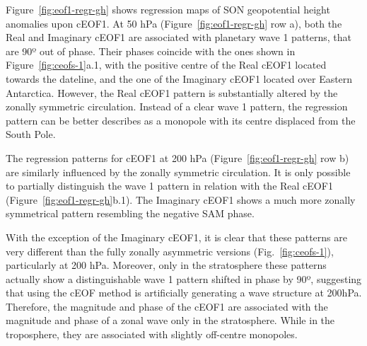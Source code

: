 \documentclass[smallextended]{svjour3}       %
\begin{document}
Figure~\ref{fig:eof1-regr-gh} shows regression maps of SON geopotential height anomalies upon cEOF1.
At 50 hPa (Figure~\ref{fig:eof1-regr-gh} row a), both the Real and Imaginary cEOF1 are associated with planetary wave 1 patterns, that are 90º out of phase.
Their phases coincide with the ones shown in Figure~\ref{fig:ceofs-1}a.1, with the positive centre of the Real cEOF1 located towards the dateline, and the one of the Imaginary cEOF1 located over Eastern Antarctica.
However, the Real cEOF1 pattern is substantially altered by the zonally symmetric circulation.
Instead of a clear wave 1 pattern, the regression pattern can be better describes as a monopole with its centre displaced from the South Pole.

The regression patterns for cEOF1 at 200 hPa (Figure~\ref{fig:eof1-regr-gh} row b) are similarly influenced by the zonally symmetric circulation.
It is only possible to partially distinguish the wave 1 pattern in relation with the Real cEOF1 (Figure~\ref{fig:eof1-regr-gh}b.1).
The Imaginary cEOF1 shows a much more zonally symmetrical pattern resembling the negative SAM phase.

With the exception of the Imaginary cEOF1, it is clear that these patterns are very different than the fully zonally asymmetric versions (Fig.~\ref{fig:ceofs-1}), particularly at 200 hPa.
Moreover, only in the stratosphere these patterns actually show a distinguishable wave 1 pattern shifted in phase by 90º, suggesting that using the cEOF method is artificially generating a wave structure at 200hPa.
Therefore, the magnitude and phase of the cEOF1 are associated with the magnitude and phase of a zonal wave only in the stratosphere.
While in the troposphere, they are associated with slightly off-centre monopoles.
\end{document}
